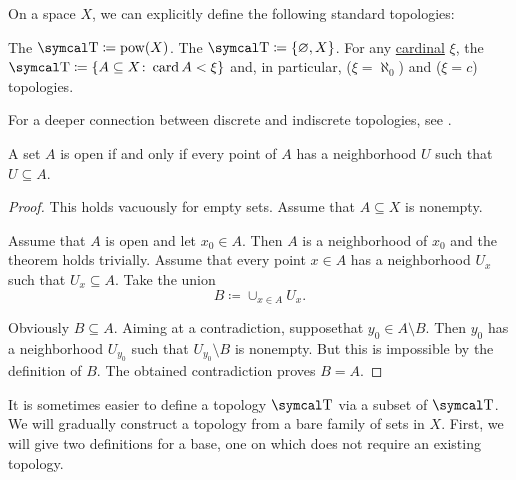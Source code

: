 \begin{definition}\label{def:standard_topologies}
  On a space \( X \), we can explicitly define the following standard topologies:
  \begin{DefEnum}
     The  \( \CT \coloneqq \Pow(X) \).
     The  \( \CT \coloneqq \{ \varnothing, X \} \).
     For any \hyperref[def:cardinal]{cardinal} \( \xi \), the  \( \CT \coloneqq \{ A \subseteq X \colon \Card A < \xi \} \) and, in particular,  (\( \xi = \aleph_0 \)) and  (\( \xi = c \)) topologies.
  \end{DefEnum}

  For a deeper connection between discrete and indiscrete topologies, see .
\end{definition}

\begin{proposition}\label{thm:set_open_iff_neighborhood_is_contained}
  A set \( A \) is open if and only if every point of \( A \) has a neighborhood \( U \) such that \( U \subseteq A \).
\end{proposition}
\begin{proof}
  This holds vacuously for empty sets. Assume that \( A \subseteq X \) is nonempty.

  \Sufficiency Assume that \( A \) is open and let \( x_0 \in A \). Then \( A \) is a neighborhood of \( x_0 \) and the theorem holds trivially.
  \Necessity Assume that every point \( x \in A \) has a neighborhood \( U_x \) such that \( U_x \subseteq A \). Take the union
  \begin{equation*}
    B \coloneqq \cup_{x \in A} U_x.
  \end{equation*}

  Obviously \( B \subseteq A \). Aiming at a contradiction, suppose\LEM that \( y_0 \in A \setminus B \). Then \( y_0 \) has a neighborhood \( U_{y_0} \) such that \( U_{y_0} \setminus B \) is nonempty. But this is impossible by the definition of \( B \). The obtained contradiction proves \( B = A \).
\end{proof}

\begin{remark}\label{rem:abritrary_family_to_topology}
  It is sometimes easier to define a topology \( \CT \) via a subset of \( \CT \). We will gradually construct a topology from a bare family of sets in \( X \). First, we will give two definitions for a base, one on which does not require an existing topology.
\end{remark}


